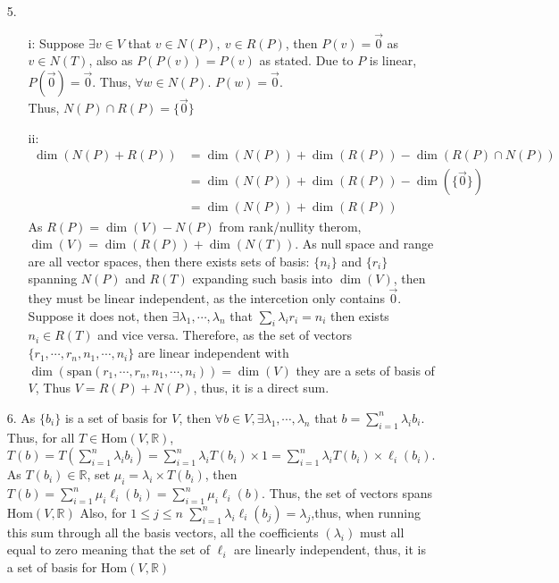 \documentclass{article}
\begin{document}
\begin{itemize}
    \item [5.]
    \begin{itemize}
        \item [i:] Suppose \(\exists v\in V\) that \(v\in N(P),\ v \in R(P)\), then \(P(v) = \overrightarrow{0}\) as \(v\in N(T)\), also as \(P(P(v)) = P(v)\) as stated. Due to \(P\) is linear, \(P(\overrightarrow{0}) = \overrightarrow{0}\). Thus, \(\forall w\in N(P)\). \(P(w)=\overrightarrow{0}\). \\ Thus, \(N(P)\cap R(P) = \{\overrightarrow{0}\}\)
        \item [ii:]\begin{align*}
            \dim (N(P)+R(P)) &= \dim(N(P))+\dim(R(P))-\dim(R(P)\cap N(P))\\
            &=\dim(N(P))+\dim(R(P))-\dim(\{\overrightarrow{0}\})\\
            &=\dim(N(P))+\dim(R(P))
        \end{align*}
        As \(R(P) = \dim(V) - N(P)\) from rank/nullity therom,\\ \(\dim(V) = \dim(R(P))+\dim(N(T))\). As null space and range are all vector spaces, then there exists sets of basis: \(\{n_i\}\) and \(\{r_i\}\) spanning \(N(P)\) and \(R(T)\) expanding such basis into \(\dim(V)\), then they must be linear independent, as the intercetion only contains \(\overrightarrow{0}\). Suppose it does not, then \(\exists \lambda_1,\cdots,\lambda_n\) that \(\sum_i \lambda_i r_i = n_i\) then exists \(n_i\in R(T)\) and vice versa.
        Therefore, as the set of vectors \(\{r_1,\cdots,r_n,n_1,\cdots,n_i\}\) are linear independent with
        \\ \(\dim(\text{span}(r_1,\cdots,r_n,n_1,\cdots,n_i)) = \dim(V)\) they are a sets of basis of \(V\), Thus \(V = R(P)+N(P)\), thus, it is a direct sum.
    \end{itemize}
    \item [6.] As \(\{b_i\}\) is a set of basis for \(V\), then \(\forall b \in V, \exists \lambda_1,\cdots,\lambda_n\) that \(b = \sum_{i=1}^n \lambda_ib_i\). 
    Thus, for all \(T\in \text{Hom}(V,\mathbb{R})\),\\  \(T(b) = T(\sum_{i=1}^n \lambda_ib_i) = \sum_{i=1}^n\lambda_iT(b_i)\times 1 = \sum_{i=1}^n\lambda_iT(b_i)\times \ell_i(b_i) \). As \(T(b_i)\in \mathbb{R}\), set \(\mu_i = \lambda_i\times T(b_i)\), then \(T(b)=\sum_{i=1}^{n}\mu_i \ell_i(b_i)=\sum_{i=1}^{n}\mu_i \ell_i(b)\). Thus, the set of vectors spans \(\text{Hom}(V,\mathbb{R})\)
    Also, for \(1\leq j \leq n\) \(\sum_{i=1}^{n}\lambda_i\ell_i(b_j) = \lambda_j\),thus, when running this sum through all the basis vectors, all the coefficients \((\lambda_i)\) must all equal to zero meaning that the set of \(\ell _i\) are linearly independent, thus, it is a set of basis for \(\text{Hom}(V,\mathbb{R})\)

\end{itemize}
\end{document}
